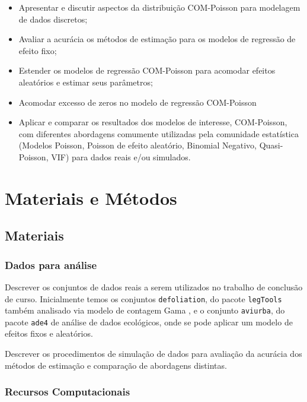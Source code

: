 \documentclass[
	12pt,				%
	openright,			%
	oneside,			%
	a4paper,			%
	english,			%
	brazil,				%
	]{abntex2}
\begin{document}
\begin{itemize}
	\item Apresentar e discutir aspectos da distribuição 
	COM-Poisson para modelagem de dados discretos;
	
	\item Avaliar a acurácia os métodos de estimação para 
	os modelos de regressão de efeito fixo;
	
	\item Estender os modelos de regressão COM-Poisson para 
	acomodar efeitos aleatórios e estimar seus parâmetros;
	
	\item Acomodar excesso de zeros no modelo de regressão 
	COM-Poisson
	
	\item Aplicar e comparar os resultados dos modelos de 
	interesse, COM-Poisson, com diferentes abordagens 
	comumente utilizadas pela comunidade estatística 
	(Modelos Poisson, Poisson de efeito aleatório, Binomial
	Negativo, Quasi-Poisson, VIF) para dados reais e/ou 
	simulados.
\end{itemize}

\chapter{Materiais e Métodos}
\section{Materiais}

\subsection{Dados para análise}

Descrever os conjuntos de dados reais a serem utilizados no 
trabalho de conclusão de curso. Inicialmente temos os 
conjuntos \texttt{defoliation}, do pacote \texttt{legTools}
também analisado via modelo de contagem Gama 
\cite{Zeviani2014}, e o conjunto \texttt{aviurba}, do pacote
\texttt{ade4} de análise de dados ecológicos, onde se pode 
aplicar um modelo de efeitos fixos e aleatórios.

Descrever os procedimentos de simulação de dados para 
avaliação da acurácia dos métodos de estimação e comparação 
de abordagens distintas.

\subsection{Recursos Computacionais}
\end{document}

